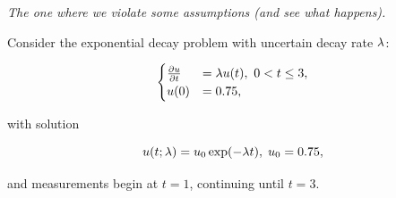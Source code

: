 \begin{frame}{\it The one where we violate some assumptions (and see what happens).}

Consider the exponential decay problem with uncertain decay rate $\lambda$:

\bigskip
$$
\begin{cases}
\frac{\partial u}{\partial t} & = \lambda u(t), \ 0<t\leq 3, \\ u(0) &= 0.75,
\end{cases}
$$

\bigskip
with solution

\begin{equation}
u(t;\lambda) = u_0\exp(-\lambda t), \; u_0 = 0.75 ,
\end{equation}

\bigskip
and measurements begin at $t=1$, continuing until $t=3$.
\end{frame}


